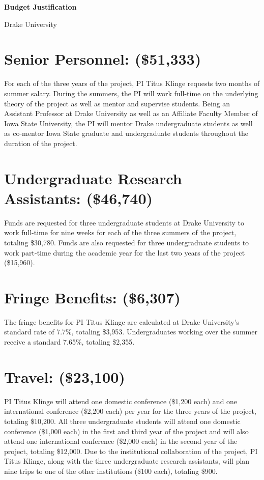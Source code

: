 \documentclass[11pt]{article}
\begin{document}
    \setcounter{page}{1}
    \begin{center}
        {\Large {\bf Budget Justification}}
    \end{center}

    \begin{center}
        {\Large Drake University}
    \end{center}

    \section*{Senior Personnel: (\$51,333)}
    For each of the three years of the project, PI Titus Klinge requests two months of summer salary.
    During the summers, the PI will work full-time on the underlying theory of the project as well as mentor and supervise students.
    Being an Assistant Professor at Drake University as well as an Affiliate Faculty Member of Iowa State University, the PI will mentor Drake undergraduate students as well as co-mentor Iowa State graduate and undergraduate students throughout the duration of the project.

    \section*{Undergraduate Research Assistants: (\$46,740)}
    Funds are requested for three undergraduate students at Drake University to work full-time for nine weeks for each of the three summers of the project, totaling \$30,780.
    Funds are also requested for three undergraduate students to work part-time during the academic year for the last two years of the project (\$15,960).

    \section*{Fringe Benefits: (\$6,307)}
    The fringe benefits for PI Titus Klinge are calculated at Drake University's standard rate of 7.7\%, totaling \$3,953.
    Undergraduates working over the summer receive a standard 7.65\%, totaling \$2,355.

    \section*{Travel: (\$23,100)}
    PI Titus Klinge will attend one domestic conference (\$1,200 each) and one international conference (\$2,200 each) per year for the three years of the project, totaling \$10,200.
    All three undergraduate students will attend one domestic conference (\$1,000 each) in the first and third year of the project and will also attend one international conference (\$2,000 each) in the second year of the project, totaling \$12,000.
    Due to the institutional collaboration of the project, PI Titus Klinge, along with the three undergraduate research assistants, will plan nine trips to one of the other institutions (\$100 each), totaling \$900.
\end{document}
